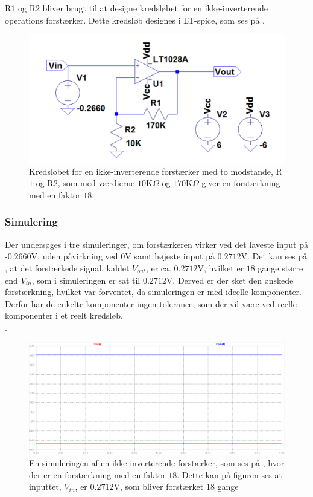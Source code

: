 R$1$ og R$2$ bliver brugt til at designe kredsløbet for en ikke-inverterende operations forstærker. Dette kredsløb designes i LT-spice, som ses på . 
\begin{figure}[H]
\centering
\includegraphics[scale=0.5]{figures/cProblemloesning/Forstaerker_faktor18.PNG}
\caption{Kredsløbet for en ikke-inverterende forstærker med to modstande, R$1$ og R$2$, som med værdierne $10$K$\Omega$ og $170$K$\Omega$ giver en forstærkning med en faktor $18$.}
\label{fig:Forstaerker_faktor18}
\end{figure} 

\subsubsection{Simulering}
Der undersøges i tre simuleringer, om forstærkeren virker ved det laveste input på -$0.2660$V, uden påvirkning ved $0$V samt højeste input på $0.2712$V. Det kan ses på , at det forstærkede signal, kaldet $V_{out}$, er ca. $0.2712$V, hvilket er $18$ gange større end $V_{in}$, som i simuleringen er sat til $0.2712$V. Derved er der sket den ønskede forstærkning, hvilket var forventet, da simuleringen er med ideelle komponenter. Derfor har de enkelte komponenter ingen tolerance, som der vil være ved reelle komponenter i et reelt kredsløb. \\. 

\begin{figure}[H]
\centering
\includegraphics[scale=0.4]{figures/cProblemloesning/Forstaerker_faktor18_simulering.PNG}
\caption{En simuleringen af en ikke-inverterende forstærker, som ses på , hvor der er en forstærkning med en faktor $18$. Dette kan på figuren ses at inputtet, $V_{in}$, er $0.2712$V, som bliver forstærket $18$ gange}
\label{fig:Forstaerker_faktor18_simulering}
\end{figure}

